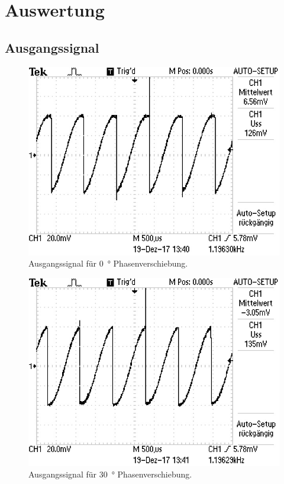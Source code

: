 \section{Auswertung}
\label{sec:Auswertung}
\subsection{Ausgangssignal}
\begin{figure}[H]
  \centering
  \includegraphics{content/images/0Phase.png}
  \caption{Ausgangssignal für \SI{0}{\degree} Phasenverschiebung.}
  \label{pic:0p}
\end{figure}
\begin{figure}[H]
  \centering
  \includegraphics{content/images/30Phase.png}
  \caption{Ausgangssignal für \SI{30}{\degree} Phasenverschiebung.}
  \label{pic:3p}
\end{figure}

